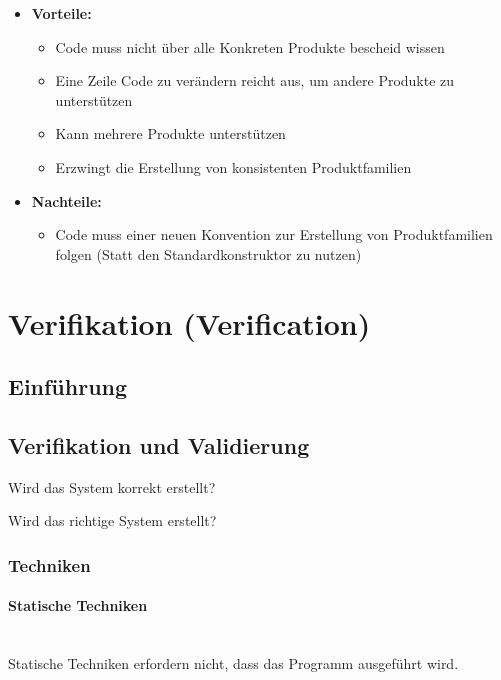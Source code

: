 \documentclass[
    ngerman,
    color=3b,
    summary,
    boxarc,
    main,
]{rubos-tuda-template}
\begin{document}
\begin{itemize}
    \item \textbf{Vorteile:}\begin{itemize}
              \item Code muss nicht über alle Konkreten Produkte bescheid wissen
              \item Eine Zeile Code zu verändern reicht aus, um andere Produkte zu unterstützen
              \item Kann mehrere Produkte unterstützen
              \item Erzwingt die Erstellung von konsistenten Produktfamilien
          \end{itemize}
    \item \textbf{Nachteile:}\begin{itemize}
              \item Code muss einer neuen Konvention zur Erstellung von Produktfamilien folgen (Statt den Standardkonstruktor zu nutzen)
          \end{itemize}
\end{itemize}

\clearpage
\section{Verifikation (Verification)}
\subsection{Einführung}

\subsection{Verifikation und Validierung}
\begin{definition}[Verifikation]
    Wird das System korrekt erstellt?
\end{definition}
\begin{definition}[Validierung]
    Wird das richtige System erstellt?
\end{definition}

\subsubsection{Techniken}
\paragraph{Statische Techniken}\mbox{}\\
Statische Techniken erfordern nicht, dass das Programm ausgeführt wird.
\end{document}
